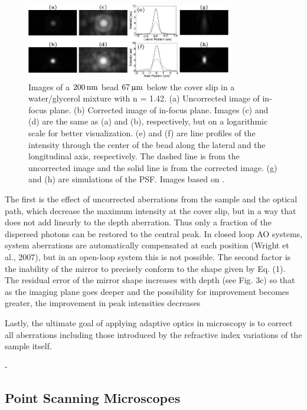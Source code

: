 \begin{figure}[htb]
	\centering
		\includegraphics[width=0.80\textwidth]{images/wide_flour_spher_All.jpg}
	\caption{Images of a $\unit[200]{nm}$ bead $\unit[67]{\upmu m}$ below the 
cover slip in a water/glycerol mixture with n = 1.42.  (a) Uncorrected image 
of in-focus plane. (b) Corrected image of in-focus plane. Images (c) and (d) 
are the same as (a) and (b), respectively, but on a logarithmic scale for 
better visualization. (e) and (f) are line profiles of the intensity through 
the center of the bead along the lateral and the longitudinal axis, 
respectively. The dashed line is from the uncorrected image and the solid 
line is from the corrected image. (g) and (h) are simulations of the PSF. 
Images based on \cite{wide_AOM_FM_spehrical_correction}.}
	\label{fig:wide_flour_spher_All} 
\end{figure}


The first is the effect of uncorrected aberrations from the sample and the 
optical path, which decrease the maximum intensity at the cover slip, but in 
a way that does not add linearly to the depth aberration. Thus only a 
fraction of the dispersed photons can be restored to the central peak. In 
closed loop AO systems, system aberrations are automatically compensated at 
each position (Wright et al., 2007), but in an open-loop system this is not 
possible. The second factor is the inability of the mirror to precisely 
conform to the shape given by Eq. (1). The residual error of the mirror shape 
increases with depth (see Fig. 3c) so that as the imaging plane goes deeper 
and the possibility for improvement becomes greater, the improvement in peak 
intensities decreases

Lastly, the ultimate goal of applying adaptive optics in microscopy is to 
correct all aberrations including those introduced by the refractive index 
variations of the sample itself.
\cite{wide_AOM_FM_spehrical_correction}

\cite{wide_MPFM}


-
\subsection{Point Scanning Microscopes}
\label{sec:PointScanningMicroscopes}

